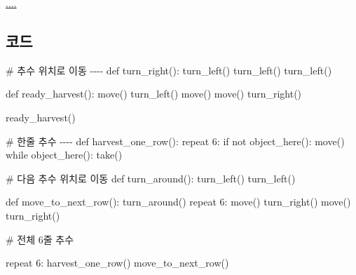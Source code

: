 \documentclass[
  b5paperpaper,
  DIV=11,
  numbers=noendperiod]{scrreprt}
\newenvironment{Shaded}{\begin{snugshade}}{\end{snugshade}}
\newcommand{\CommentTok}[1]{\textcolor[rgb]{0.37,0.37,0.37}{#1}}
\newcommand{\ControlFlowTok}[1]{\textcolor[rgb]{0.00,0.23,0.31}{#1}}
\newcommand{\DecValTok}[1]{\textcolor[rgb]{0.68,0.00,0.00}{#1}}
\newcommand{\FunctionTok}[1]{\textcolor[rgb]{0.28,0.35,0.67}{#1}}
\newcommand{\NormalTok}[1]{\textcolor[rgb]{0.00,0.23,0.31}{#1}}
\newcommand{\SpecialCharTok}[1]{\textcolor[rgb]{0.37,0.37,0.37}{#1}}
\begin{document}
\url{....}

\hypertarget{uxcf54uxb4dc-26}{%
\subsection{코드}\label{uxcf54uxb4dc-26}}

\begin{Shaded}
\begin{Highlighting}[]
\CommentTok{\# 추수 위치로 이동 {-}{-}{-}{-}}
\NormalTok{def }\FunctionTok{turn\_right}\NormalTok{()}\SpecialCharTok{:}
    \FunctionTok{turn\_left}\NormalTok{()}
    \FunctionTok{turn\_left}\NormalTok{()}
    \FunctionTok{turn\_left}\NormalTok{()}
    
\NormalTok{def }\FunctionTok{ready\_harvest}\NormalTok{()}\SpecialCharTok{:}
    \FunctionTok{move}\NormalTok{()}
    \FunctionTok{turn\_left}\NormalTok{()}
    \FunctionTok{move}\NormalTok{()}
    \FunctionTok{move}\NormalTok{()}
    \FunctionTok{turn\_right}\NormalTok{()}
  
\FunctionTok{ready\_harvest}\NormalTok{()}

\CommentTok{\# 한줄 추수 {-}{-}{-}{-}}
\NormalTok{def }\FunctionTok{harvest\_one\_row}\NormalTok{()}\SpecialCharTok{:}
    \ControlFlowTok{repeat} \DecValTok{6}\SpecialCharTok{:}
        \ControlFlowTok{if}\NormalTok{ not }\FunctionTok{object\_here}\NormalTok{()}\SpecialCharTok{:}
            \FunctionTok{move}\NormalTok{()}
        \ControlFlowTok{while} \FunctionTok{object\_here}\NormalTok{()}\SpecialCharTok{:}
            \FunctionTok{take}\NormalTok{()}

\CommentTok{\# 다음 추수 위치로 이동}
\NormalTok{def }\FunctionTok{turn\_around}\NormalTok{()}\SpecialCharTok{:}
    \FunctionTok{turn\_left}\NormalTok{()}
    \FunctionTok{turn\_left}\NormalTok{()}

\NormalTok{def }\FunctionTok{move\_to\_next\_row}\NormalTok{()}\SpecialCharTok{:}    
    \FunctionTok{turn\_around}\NormalTok{()}
    \ControlFlowTok{repeat} \DecValTok{6}\SpecialCharTok{:}
        \FunctionTok{move}\NormalTok{()}
    \FunctionTok{turn\_right}\NormalTok{()}
    \FunctionTok{move}\NormalTok{()}
    \FunctionTok{turn\_right}\NormalTok{()}

\CommentTok{\# 전체 6줄 추수}

\ControlFlowTok{repeat} \DecValTok{6}\SpecialCharTok{:}
    \FunctionTok{harvest\_one\_row}\NormalTok{()}
    \FunctionTok{move\_to\_next\_row}\NormalTok{()}
\end{Highlighting}
\end{Shaded}
\end{document}
